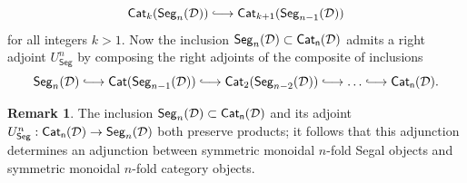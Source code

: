 \documentclass[10pt, reqno, twoside
, final
]{amsart}
\numberwithin{equation}{subsection}%
\theoremstyle{definition}
\theoremstyle{definition}
\theoremstyle{definition}
\theoremstyle{definition}
\theoremstyle{definition}
\theoremstyle{definition}
\theoremstyle{definition}
\theoremstyle{definition}
\theoremstyle{definition}
\theoremstyle{plain}
\theoremstyle{definition}
\theoremstyle{plain}
\theoremstyle{definition}
\theoremstyle{plain}
\theoremstyle{definition}
\newtheorem{rmk}[defn]{Remark}
\theoremstyle{definition}
\theoremstyle{plain}
\theoremstyle{plain}
\theoremstyle{definition}
\theoremstyle{plain}
\theoremstyle{plain}
\theoremstyle{plain}
\begin{document}
\[  \cat_k(\mathsf{Seg}_n(\icatd)) \hooklongrightarrow  \cat_{k+1}(\mathsf{Seg}_{n-1}(\icatd)) \]
for all integers $k>1$. Now the inclusion $\mathsf{Seg}_n(\mathcal{D})\subset \mathsf{Cat_n}(\mathcal{D})$ admits a right adjoint $U_{\mathsf{Seg}}^n$ by composing the right adjoints of the composite of inclusions
\[ \mathsf{Seg}_n(\icatd)\hooklongrightarrow \cat(\mathsf{Seg}_{n-1}(\icatd)) \hooklongrightarrow   \cat_2(\mathsf{Seg}_{n-2}(\icatd)) \hooklongrightarrow \ldots\hooklongrightarrow \mathsf{Cat_n}(\icatd).   \]
\begin{rmk}
The inclusion $\mathsf{Seg}_n(\mathcal{D})\subset \mathsf{Cat_n}(\mathcal{D})$ and its adjoint $U^n_{\mathsf{Seg}}:\mathsf{Cat_n}(\mathcal{D})\rightarrow \mathsf{Seg}_n(\mathcal{D})$ both preserve products; it follows that this adjunction determines an adjunction between symmetric monoidal $n$-fold Segal objects and symmetric monoidal $n$-fold category objects.
\end{rmk}
\end{document}

